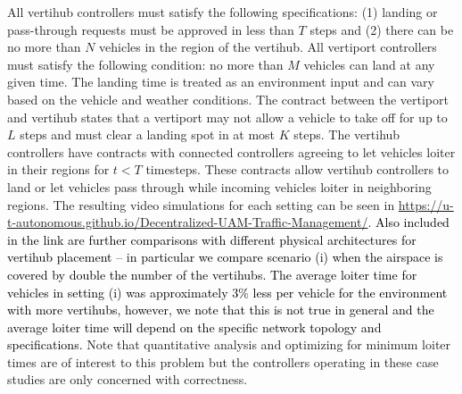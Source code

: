 All vertihub controllers must satisfy the following specifications: (1) landing or pass-through requests must be approved in less than $T$ steps and (2) there can be no more than $N$ vehicles in the region of the vertihub. 
All vertiport controllers must satisfy the following condition: no more than $M$ vehicles can land at any given time. The landing time is treated as an environment input and can vary based on the vehicle and weather conditions. The contract between the vertiport and vertihub states that a vertiport may not allow a vehicle to take off for up to $L$ steps and must clear a landing spot in at most $K$ steps. The vertihub controllers have contracts with connected controllers agreeing to let vehicles loiter in their regions for $t < T$ timesteps. These contracts allow vertihub controllers to land or let vehicles pass through while incoming vehicles loiter in neighboring regions.
The resulting video simulations for each setting can be seen in  \href{https://u-t-autonomous.github.io/Decentralized-UAM-Traffic-Management/}{https://u-t-autonomous.github.io/Decentralized-UAM-Traffic-Management/}.
\textcolor{black}{Also included in the link are further comparisons with different physical architectures for vertihub placement -- in particular we compare scenario (i) when the airspace is covered by double the number of the vertihubs. The average loiter time for vehicles in setting (i) was approximately 3\% less per vehicle for the environment with more vertihubs, however, we note that this is not true in general and the average loiter time will depend on the specific network topology and specifications.}
Note that quantitative analysis and optimizing for minimum loiter times are of interest to this problem but the controllers operating in these case studies are only concerned with correctness.

